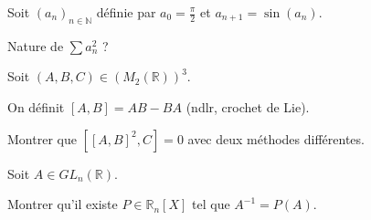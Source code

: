 \noindent Soit $(a_n)_{n \in \mathbb{N}}$ définie par $a_0 = \frac {\pi} {2}$ et $a_{n+1} = \sin(a_n)$.

\vspace{5pt}
\noindent Nature de $\sum a_n^2$ ?



\subetoiles



\noindent Soit $(A, B, C) \in (M_2(\mathbb{R}))^3$.

\vspace{5pt}
\noindent On définit $\left[A, B\right] = AB - BA$ (ndlr, crochet de Lie).

\vspace{5pt}
\noindent Montrer que $\left[\left[A, B\right]^2, C\right] = 0$ avec deux méthodes différentes.



\subetoiles



\noindent Soit $A \in GL_n(\mathbb{R})$.

\vspace{5pt}
\noindent Montrer qu'il existe $P \in \mathbb{R}_n[X]$ tel que $A^{-1} = P(A)$.
